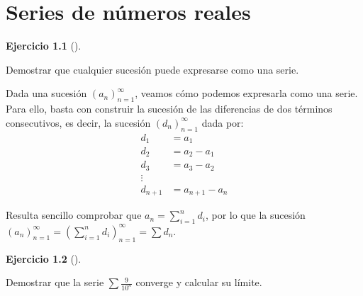\documentclass[
  a4paper,
]{scrreport}
\theoremstyle{definition}
\newtheorem{exercise}{Ejercicio}[chapter]
\theoremstyle{remark}
\begin{document}

\hypertarget{series-de-nuxfameros-reales}{%
\chapter{Series de números reales}\label{series-de-nuxfameros-reales}}

\begin{exercise}[]\protect\hypertarget{exr-conversion-sucesiones-series}{}\label{exr-conversion-sucesiones-series}

Demostrar que cualquier sucesión puede expresarse como una serie.

\end{exercise}

\begin{tcolorbox}[enhanced jigsaw, rightrule=.15mm, opacityback=0, bottomtitle=1mm, titlerule=0mm, toprule=.15mm, breakable, colframe=quarto-callout-tip-color-frame, left=2mm, opacitybacktitle=0.6, title=\textcolor{quarto-callout-tip-color}{\faLightbulb}\hspace{0.5em}{Solución}, toptitle=1mm, colback=white, colbacktitle=quarto-callout-tip-color!10!white, arc=.35mm, bottomrule=.15mm, coltitle=black, leftrule=.75mm]

Dada una sucesión \((a_n)_{n=1}^\infty\), veamos cómo podemos expresarla
como una serie. Para ello, basta con construir la sucesión de las
diferencias de dos términos consecutivos, es decir, la sucesión
\((d_n)_{n=1}^\infty\) dada por: \begin{align*}
d_1&=a_1\\ 
d_2&=a_2-a_1\\ 
d_3&=a_3-a_2\\ 
\vdots\\ 
d_{n+1}&=a_{n+1}-a_n
\end{align*}

Resulta sencillo comprobar que \(a_n=\sum_{i=1}^n d_i\), por lo que la
sucesión
\((a_n)_{n=1}^\infty = \left(\sum_{i=1}^n d_i\right)_{n=1}^\infty = \sum d_n\).

\end{tcolorbox}

\begin{exercise}[]\protect\hypertarget{exr-números-decimales-series}{}\label{exr-números-decimales-series}

Demostrar que la serie \(\sum \frac{9}{10^n}\) converge y calcular su
límite.

\end{exercise}
\end{document}
